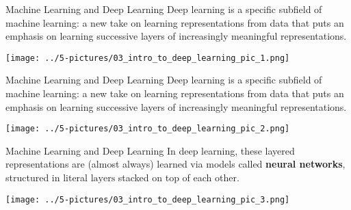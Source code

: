\documentclass[11pt]{beamer}
\newcommand{\highlight}[1]{%
  \colorbox{yellow!100}{$\displaystyle#1$}}
\begin{document}
\begin{frame}{Machine Learning and Deep Learning}
	Deep learning is a specific subfield of machine learning: a new take on learning representations from data that puts an emphasis on learning successive layers of increasingly meaningful representations.
	\begin{center}
	\texttt{[image: ../5-pictures/03\_intro\_to\_deep\_learning\_pic\_1.png]}
	\end{center}
\end{frame}
\begin{frame}{Machine Learning and Deep Learning}
	Deep learning is a specific subfield of machine learning: a new take on learning representations from data that puts an emphasis on learning successive layers of increasingly meaningful representations.
	\begin{center}
	\texttt{[image: ../5-pictures/03\_intro\_to\_deep\_learning\_pic\_2.png]}
	\end{center}
\end{frame}
\begin{frame}{Machine Learning and Deep Learning}
	In deep learning, these layered representations are (almost always) learned via models called \textbf{neural networks}, structured in literal \highlight{\text{layers}} stacked on top of each other.
	\begin{center}
	\texttt{[image: ../5-pictures/03\_intro\_to\_deep\_learning\_pic\_3.png]}
	\end{center}
\end{frame}
\end{document}
